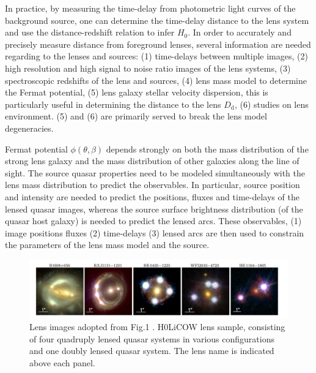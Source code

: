 \documentclass{cosmo}
\begin{document}
    In practice, by measuring the time-delay from photometric light curves of the background source, one can determine the time-delay distance to the lens system and use the distance-redshift relation to infer $H_\mathrm{0}$. In order to accurately and precisely measure distance from foreground lenses, several information are needed regarding to the lenses and sources:
    (1) time-delays between multiple images, (2) high resolution and high signal to noise ratio images of the lens systems, (3) spectroscopic redshifts of the lens and sources, (4) lens mass model to determine the Fermat potential, (5) lens galaxy stellar velocity dispersion, this is particularly useful in determining the distance to the lens $D_\mathrm{d}$, (6) studies on lens environment. (5) and (6) are primarily served to break the lens model degeneracies.
    
     Fermat potential $\phi(\theta, \beta)$ depends strongly on both the mass distribution of the strong lens galaxy and the mass distribution of other galaxies along the line of sight. The source quasar properties need to be modeled simultaneously with the lens mass distribution to predict the observables. In particular, source position and intensity are needed to predict the positions, fluxes and time-delays of the lensed quasar images, whereas the source surface brightness distribution (of the quasar host galaxy) is needed to predict the lensed arcs. These observables, (1) image positions fluxes (2) time-delays (3) lensed arcs are then used to constrain the parameters of the lens mass model and the source.
    
    \begin{figure}
        \centering
        \includegraphics[width=\textwidth]{fig1_2.png}
        \caption{Lens images adopted from Fig.1 \cite{Suyu2017}. H0LiCOW lens sample, consisting of four quadruply lensed quasar systems in various configurations and one doubly lensed quasar system. The lens name is indicated above each panel.}
        \label{fig1}
    \end{figure}
    
\end{document}
